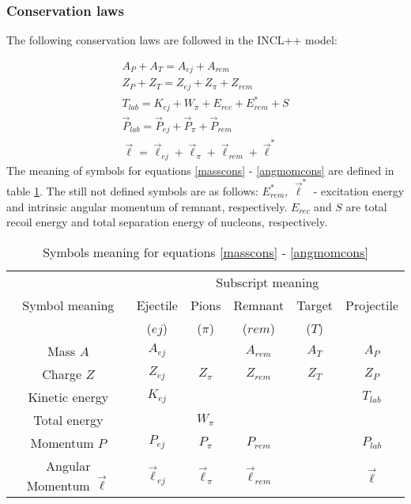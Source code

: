 \subsubsection{Conservation laws}

The following conservation laws are followed in the INCL++ model: 

\begin{gather}
	A_P + A_T = A_{ej} + A_{rem} \label{masscons} \\ 
	Z_P  + Z_T = Z_{ej}+Z_{\pi}+Z_{rem} \label{chargecons} \\
	T_{lab} = K_{ej} +W_{\pi}+E_{rec}+E_{rem}^{*}+S \label{Energycons} \\ 
	\vec{P}_{lab} = \vec{P}_{ej} +\vec{P}_{\pi}+\vec{P}_{rem} \label{momcons} \\ 
	\vec{\ell} = \vec{\ell}_{ej}+\vec{\ell}_{\pi}+\vec{\ell}_{rem}+\vec{\ell}^* \label{angmomcons}
\end{gather}
The meaning of symbols for equations \ref{masscons} - \ref{angmomcons} are defined in table \ref{tab:consv}. The still not defined symbols are as follows: 
 $E_{rem}^{*}$, $\vec{\ell}^*$ - excitation energy and intrinsic angular momentum of remnant, respectively. $E_{rec}$ and $S$ are total recoil energy and total separation energy of nucleons, respectively. \\
\begin{table}
    \centering
    \begin{tabular}{|c|c|c|c|c|c|}
         \hline
          \multirow{3}{*}{Symbol meaning} & \multicolumn{5}{c|}{Subscript meaning} \\
          \cline{2-6}
         &  Ejectile  &Pions &Remnant & Target& Projectile\\
         & (${ej}$)& (${\pi}$)&($rem$) & ($T$) & \\
         \hline
        Mass $A$ & $A_{ej}$ & &$A_{rem}$   &$A_{T}$ & $A_{P}$\\
         \hline
         Charge $Z$  & $Z_{ej}$  & $Z_{\pi}$ & $Z_{rem}$ & $Z_{T}$  &$Z_{P}$ \\
         \hline
         Kinetic energy & $K_{ej}$ &  &  &  &$T_{lab}$ \\
         \hline
         Total energy &  & $W_{\pi}$  &  &  & \\
         \hline
          Momentum $P$ & $P_{ej}$ &$P_{\pi}$ & $P_{rem}$  &  &$P_{lab}$ \\
         \hline
         Angular Momentum $\vec{\ell}$ & $\vec{\ell}_{ej}$ & $\vec{\ell}_{\pi}$ & $\vec{\ell}_{rem}$ &  & $\vec{\ell}$ \\
         \hline
    \end{tabular}
    \caption{Symbols meaning for equations \ref{masscons} - \ref{angmomcons}}
    \label{tab:consv}
\end{table}
 
